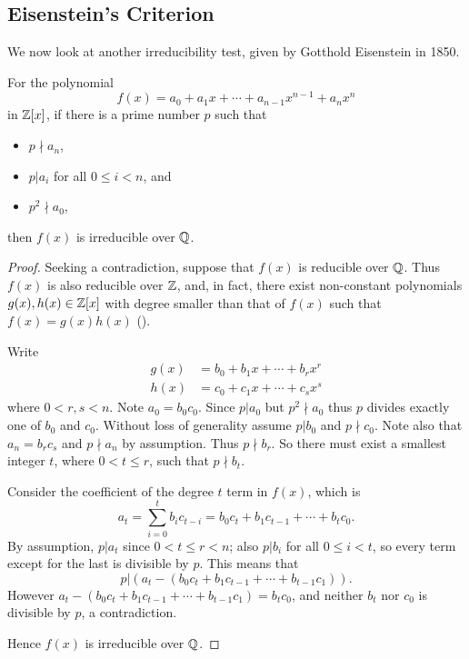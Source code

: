 \subsection{Eisenstein's Criterion}
We now look at another irreducibility test, given by Gotthold Eisenstein in 1850.

\begin{theorem}\label{thrm-eisenstein-criterion}
    For the polynomial
    \[
        f(x) = a_0 + a_1x + \cdots + a_{n-1}x^{n-1} + a_nx^n
    \]
    in $\mathbb{Z}[x]$, if there is a prime number $p$ such that
    \begin{itemize}
        \item $p \nmid a_n$,
        \item $p \vert a_i$ for all $0 \leq i < n$, and
        \item $p^2 \nmid a_0$,
    \end{itemize}
    then $f(x)$ is irreducible over $\mathbb{Q}$.
\end{theorem}
\begin{proof}
    Seeking a contradiction, suppose that $f(x)$ is reducible over $\mathbb{Q}$. Thus $f(x)$ is also reducible over $\mathbb{Z}$, and, in fact, there exist non-constant polynomials $g(x),h(x) \in \mathbb{Z}[x]$ with degree smaller than that of $f(x)$ such that $f(x) = g(x)h(x)$ ().

    Write
    \begin{align*}
        g(x) &= b_0 + b_1x + \cdots + b_rx^r\\
        h(x) &= c_0 + c_1x + \cdots + c_sx^s
    \end{align*}
    where $0 < r, s < n$. Note $a_0 = b_0c_0$. Since $p \vert a_0$ but $p^2 \nmid a_0$ thus $p$ divides exactly one of $b_0$ and $c_0$. Without loss of generality assume $p \vert b_0$ and $p \nmid c_0$. Note also that $a_n = b_rc_s$ and $p \nmid a_n$ by assumption. Thus $p \nmid b_r$. So there must exist a smallest integer $t$, where $0 < t \leq r$, such that $p \nmid b_t$.

    Consider the coefficient of the degree $t$ term in $f(x)$, which is
    \[
        a_t = \sum_{i=0}^tb_ic_{t-i} = b_0c_t + b_1c_{t-1} + \cdots + b_tc_0.
    \]
    By assumption, $p \vert a_t$ since $0 < t \leq r < n$; also $p \vert b_i$ for all $0 \leq i < t$, so every term except for the last is divisible by $p$. This means that
    \[
        p \vert (a_t - (b_0c_t + b_1c_{t-1} + \cdots + b_{t-1}c_1)).
    \]
    However $a_t - (b_0c_t + b_1c_{t-1} + \cdots + b_{t-1}c_1) = b_tc_0$, and neither $b_t$ nor $c_0$ is divisible by $p$, a contradiction.

    Hence $f(x)$ is irreducible over $\mathbb{Q}$.
\end{proof}

